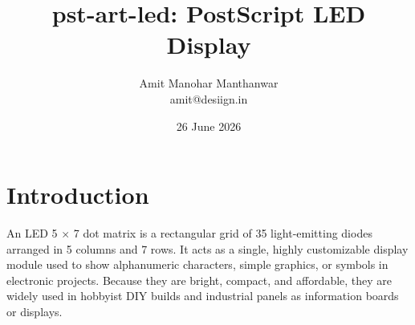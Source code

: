 \documentclass[11pt,a4paper]{../../code/pst-art}
\title{\textsf{pst-art-led}: PostScript LED Display}
\author{Amit Manohar Manthanwar\\[1mm]amit@desiign.in}
\date{26 June 2026}
\begin{document}
\tableofcontents
\printMetadata
\setlength{\parskip}{15pt}
\setlength{\baselineskip}{13pt}
\setlength{\LTpre}{10pt}%


\begin{figure}[!ht]
\centering%
\end{figure}


\section{Introduction}
An LED 5 $\times$ 7 dot matrix is a rectangular grid of 35 light-emitting diodes arranged in 5 columns and 7 rows. It acts as a single, highly customizable display module used to show alphanumeric characters, simple graphics, or symbols in electronic projects. Because they are bright, compact, and affordable, they are widely used in hobbyist DIY builds and industrial panels as information boards or displays.
\end{document}
